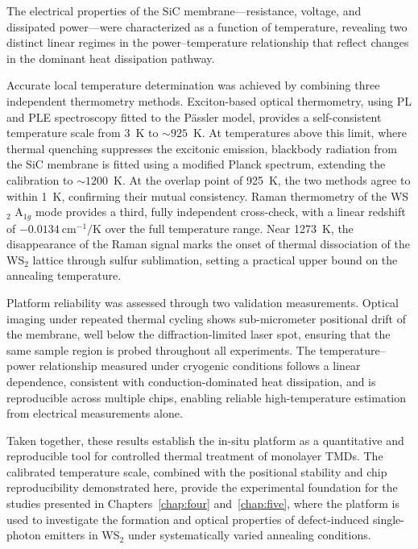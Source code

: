 The electrical properties of the SiC membrane---resistance, voltage, and dissipated power---were characterized as a function of temperature, revealing two distinct linear regimes in the power--temperature relationship that reflect changes in the dominant heat dissipation pathway.

Accurate local temperature determination was achieved by combining three independent thermometry methods. Exciton-based optical thermometry, using PL and PLE spectroscopy fitted to the Pässler model, provides a self-consistent temperature scale from 3~K to $\sim 925$~K. At temperatures above this limit, where thermal quenching suppresses the excitonic emission, blackbody radiation from the SiC membrane is fitted using a modified Planck spectrum, extending the calibration to $\sim 1200$~K. At the overlap point of 925~K, the two methods agree to within 1~K, confirming their mutual consistency. Raman thermometry of the WS$_2$ A$_{1g}$ mode provides a third, fully independent cross-check, with a linear redshift of $-0.0134~\mathrm{cm^{-1}/K}$ over the full temperature range. Near 1273~K, the disappearance of the Raman signal marks the onset of thermal dissociation of the WS$_2$ lattice through sulfur sublimation, setting a practical upper bound on the annealing temperature.

Platform reliability was assessed through two validation measurements. Optical imaging under repeated thermal cycling shows sub-micrometer positional drift of the membrane, well below the diffraction-limited laser spot, ensuring that the same sample region is probed throughout all experiments. The temperature--power relationship measured under cryogenic conditions follows a linear dependence, consistent with conduction-dominated heat dissipation, and is reproducible across multiple chips, enabling reliable high-temperature estimation from electrical measurements alone.

Taken together, these results establish the in-situ platform as a quantitative and reproducible tool for controlled thermal treatment of monolayer TMDs. The calibrated temperature scale, combined with the positional stability and chip reproducibility demonstrated here, provide the experimental foundation for the studies presented in Chapters~\ref{chap:four} and~\ref{chap:five}, where the platform is used to investigate the formation and optical properties of defect-induced single-photon emitters in WS$_2$ under systematically varied annealing conditions.





\printbibliography[heading=subbibintoc]
% 
% 
